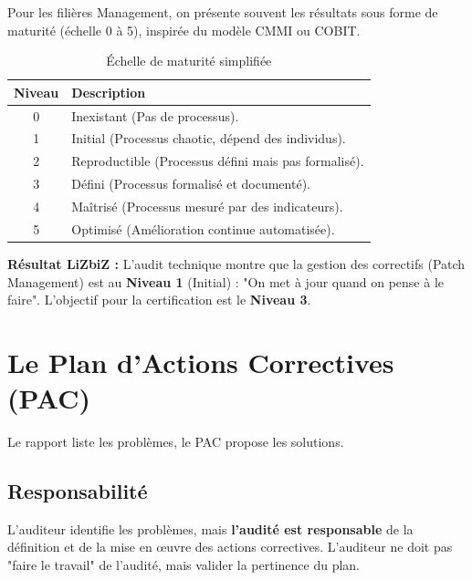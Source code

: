Pour les filières Management, on présente souvent les résultats sous forme de maturité (échelle 0 à 5), inspirée du modèle CMMI ou COBIT.

\begin{table}[htbp]
\centering
\begin{tabular}{cl}
    \toprule
    \textbf{Niveau} & \textbf{Description} \\
    \midrule
    0 & Inexistant (Pas de processus). \\
    1 & Initial (Processus chaotic, dépend des individus). \\
    2 & Reproductible (Processus défini mais pas formalisé). \\
    3 & Défini (Processus formalisé et documenté). \\
    4 & Maîtrisé (Processus mesuré par des indicateurs). \\
    5 & Optimisé (Amélioration continue automatisée). \\
    \bottomrule
\end{tabular}
\caption{Échelle de maturité simplifiée}
\end{table}

\begin{boxlizbiz}
\textbf{Résultat LiZbiZ :}
L'audit technique montre que la gestion des correctifs (Patch Management) est au \textbf{Niveau 1} (Initial) : "On met à jour quand on pense à le faire". L'objectif pour la certification est le \textbf{Niveau 3}.
\end{boxlizbiz}

\section{Le Plan d'Actions Correctives (PAC)}

Le rapport liste les problèmes, le PAC propose les solutions.

\subsection{Responsabilité}

L'auditeur identifie les problèmes, mais \textbf{l'audité est responsable} de la définition et de la mise en œuvre des actions correctives. L'auditeur ne doit pas "faire le travail" de l'audité, mais valider la pertinence du plan.

